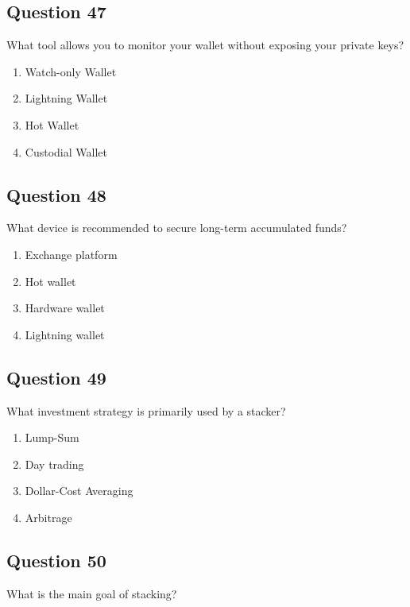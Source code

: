 \documentclass[12pt,a4paper]{article}
\begin{document}
\bigskip


\subsection*{Question 47}
What tool allows you to monitor your wallet without exposing your private keys?

\begin{enumerate}[label=\Alph*., leftmargin=*]
\item Watch-only Wallet
\item Lightning Wallet
\item Hot Wallet
\item Custodial Wallet
\end{enumerate}

\bigskip


\subsection*{Question 48}
What device is recommended to secure long-term accumulated funds?

\begin{enumerate}[label=\Alph*., leftmargin=*]
\item Exchange platform
\item Hot wallet
\item Hardware wallet
\item Lightning wallet
\end{enumerate}

\bigskip


\subsection*{Question 49}
What investment strategy is primarily used by a stacker?

\begin{enumerate}[label=\Alph*., leftmargin=*]
\item Lump-Sum
\item Day trading
\item Dollar-Cost Averaging
\item Arbitrage
\end{enumerate}

\bigskip


\subsection*{Question 50}
What is the main goal of stacking?
\end{document}
